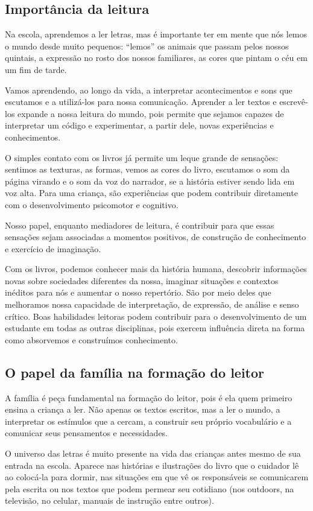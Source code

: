 \documentclass[11pt]{extarticle}
\begin{document}
\subsection{Importância da leitura}
Na escola, aprendemos a ler letras, mas é importante ter em mente que nós 
lemos o mundo desde muito pequenos: “lemos” os animais que passam pelos nossos 
quintais, a expressão no rosto dos nossos familiares, as cores que pintam o céu 
em um fim de tarde. 

Vamos aprendendo, ao longo da vida, a interpretar acontecimentos 
e sons que escutamos e a utilizá-los para nossa comunicação. Aprender a ler textos e 
escrevê-los expande a nossa leitura do mundo, pois permite que sejamos capazes de 
interpretar um código e experimentar, a partir dele, novas experiências e conhecimentos. 

O simples contato com os livros já permite um leque grande de sensações: 
sentimos as texturas, as formas, vemos as cores do livro, escutamos o som da página 
virando e o som da voz do narrador, se a história estiver sendo lida em voz alta. Para uma criança, são experiências que podem contribuir diretamente com o desenvolvimento psicomotor 
e cognitivo. 

Nosso papel, enquanto mediadores de leitura, é contribuir para que essas 
sensações sejam associadas a momentos positivos, de construção de 
conhecimento e exercício de imaginação. 

Com os livros, podemos conhecer mais da história humana, descobrir informações 
novas sobre sociedades diferentes da nossa, imaginar situações e contextos inéditos 
para nós e aumentar o nosso repertório. São por meio deles que melhoramos nossa 
capacidade de interpretação, de expressão, de análise e senso crítico. Boas habilidades 
leitoras podem contribuir para o desenvolvimento de um estudante em todas as outras 
disciplinas, pois exercem influência direta na forma como absorvemos e 
construímos conhecimento.


\subsection{O papel da família na formação do leitor}
A família é peça fundamental na formação do leitor, pois é ela quem primeiro 
ensina a criança a ler. Não apenas os textos escritos, mas a ler o mundo, a 
interpretar os estímulos que a cercam, a construir seu próprio vocabulário e a 
comunicar seus pensamentos e necessidades.

O universo das letras é muito presente na vida das crianças antes mesmo de sua 
entrada na escola. Aparece nas histórias e ilustrações do livro que o cuidador 
lê ao colocá-la para dormir, nas situações em que vê os responsáveis se comunicarem 
pela escrita ou nos textos que podem permear seu cotidiano (nos outdoors, na 
televisão, no celular, manuais de instrução entre outros). 
\end{document}
